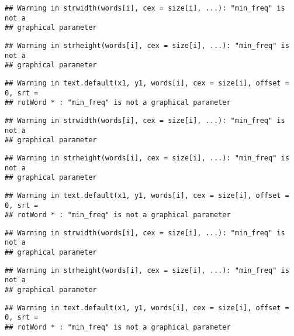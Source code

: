 \documentclass[]{article}
\begin{document}
\begin{verbatim}
## Warning in strwidth(words[i], cex = size[i], ...): "min_freq" is not a
## graphical parameter
\end{verbatim}

\begin{verbatim}
## Warning in strheight(words[i], cex = size[i], ...): "min_freq" is not a
## graphical parameter
\end{verbatim}

\begin{verbatim}
## Warning in text.default(x1, y1, words[i], cex = size[i], offset = 0, srt =
## rotWord * : "min_freq" is not a graphical parameter
\end{verbatim}

\begin{verbatim}
## Warning in strwidth(words[i], cex = size[i], ...): "min_freq" is not a
## graphical parameter
\end{verbatim}

\begin{verbatim}
## Warning in strheight(words[i], cex = size[i], ...): "min_freq" is not a
## graphical parameter
\end{verbatim}

\begin{verbatim}
## Warning in text.default(x1, y1, words[i], cex = size[i], offset = 0, srt =
## rotWord * : "min_freq" is not a graphical parameter
\end{verbatim}

\begin{verbatim}
## Warning in strwidth(words[i], cex = size[i], ...): "min_freq" is not a
## graphical parameter
\end{verbatim}

\begin{verbatim}
## Warning in strheight(words[i], cex = size[i], ...): "min_freq" is not a
## graphical parameter
\end{verbatim}

\begin{verbatim}
## Warning in text.default(x1, y1, words[i], cex = size[i], offset = 0, srt =
## rotWord * : "min_freq" is not a graphical parameter
\end{verbatim}
\end{document}
